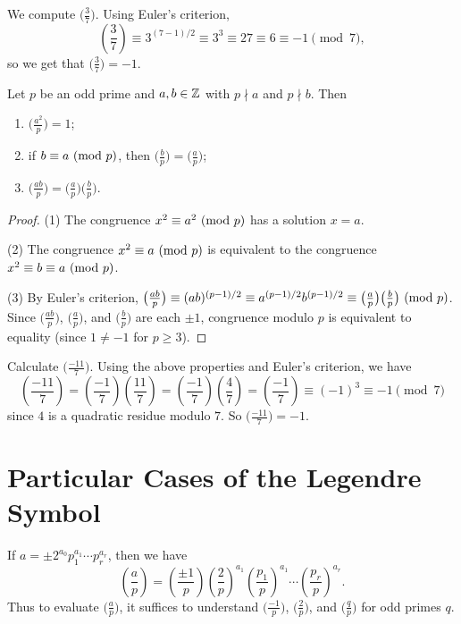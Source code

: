 \begin{example}
  We compute
  $\big(\frac{3}{7}\big)$. Using
  Euler's criterion,
  \[
    \left( \frac{3}{7} \right)
    \equiv 3^{(7 - 1) / 2}
    \equiv 3^3
    \equiv 27
    \equiv 6
    \equiv -1 \pmod{7},
  \]
  so we get that
  $\big(\frac{3}{7}\big) = -1$.
\end{example}

\begin{prop}
  Let $p$ be an odd prime and
  $a, b \in \mathbb{Z}$ with
  $p \nmid a$ and $p \nmid b$. Then
  \begin{enumerate}
    \item $\big(\frac{a^2}{p}\big) = 1$;
    \item if $b \equiv a \ (\mathrm{mod}\ p)$, then
      $\big(\frac{b}{p}\big) = \big(\frac{a}{p}\big)$;
    \item $\big(\frac{ab}{p}\big)
      = \big(\frac{a}{p}\big)
      \big(\frac{b}{p}\big)$.
  \end{enumerate}
\end{prop}

\begin{proof}
  (1) The congruence
  $x^2 \equiv a^2 \ (\mathrm{mod}\ p)$
  has a solution $x = a$.

  (2) The congruence
  $x^2 \equiv a \ (\mathrm{mod}\ p)$
  is equivalent to the congruence
  $x^2 \equiv b \equiv a \ (\mathrm{mod}\ p)$.

  (3) By Euler's criterion,
  $\big(\frac{ab}{p}\big) \equiv (ab)^{(p - 1) / 2} \equiv a^{(p - 1) / 2} b^{(p - 1) / 2} \equiv \big(\frac{a}{p}\big) \big(\frac{b}{p}\big) \ (\mathrm{mod}\ p)$.
  Since $\big(\frac{ab}{p}\big)$,
  $\big(\frac{a}{p}\big)$, and
  $\big(\frac{b}{p}\big)$ are each
  $\pm 1$, congruence modulo $p$
  is equivalent to equality
  (since $1 \ne -1$ for $p \ge 3$).
\end{proof}

\begin{example}
  Calculate $\big(\frac{-11}{7}\big)$.
  Using the above properties and
  Euler's criterion, we have
  \[
    \left( \frac{-11}{7} \right)
    =
    \left( \frac{-1}{7} \right)
    \left( \frac{11}{7} \right)
    =
    \left( \frac{-1}{7} \right)
    \left( \frac{4}{7} \right)
    =
    \left( \frac{-1}{7} \right)
    \equiv (-1)^3 \equiv -1 \pmod{7}
  \]
  since $4$ is a quadratic residue
  modulo $7$. So
  $\big(\frac{-11}{7}\big) = -1$.
\end{example}

\section{Particular Cases of the Legendre Symbol}
\begin{remark}
  If $a = \pm 2^{a_0} p_1^{a_1} \cdots p_r^{a_r}$,
  then we have
  \[
    \left( \frac{a}{p} \right)
    =
    \left( \frac{\pm 1}{p} \right)
    \left( \frac{2}{p} \right)^{a_1}
    \left( \frac{p_1}{p} \right)^{a_1}
    \cdots
    \left( \frac{p_r}{p} \right)^{a_r}.
  \]
  Thus to evaluate $\big(\frac{a}{p}\big)$,
  it suffices to understand
  $\big(\frac{-1}{p}\big)$,
  $\big(\frac{2}{p}\big)$, and
  $\big(\frac{q}{p}\big)$ for odd primes $q$.
\end{remark}

